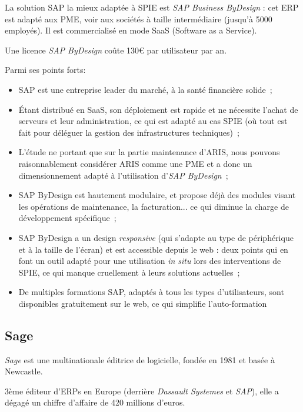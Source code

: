         La solution SAP la mieux adaptée à SPIE est \textit{SAP Business ByDesign} : cet ERP est adapté aux PME, voir aux sociétés à taille intermédiaire (jusqu'à 5000 employés). Il est commercialisé en mode SaaS (Software as a Service).

        Une licence \textit{SAP ByDesign} coûte 130€ par utilisateur par an.

        Parmi ses points forts:

        \begin{itemize}
            \item SAP est une entreprise leader du marché, à la santé financière solide~;
            \item Étant distribué en SaaS, son déploiement est rapide et ne nécessite l'achat de serveurs et leur administration, ce qui est adapté au cas SPIE (où tout est fait pour déléguer la gestion des infrastructures techniques)~;
            \item L'étude ne portant que sur la partie maintenance d'ARIS, nous pouvons raisonnablement considérer ARIS comme une PME et a donc un dimensionnement adapté à l'utilisation d'\textit{SAP ByDesign}~;
            \item SAP ByDesign est hautement modulaire, et propose déjà des modules visant les opérations de maintenance, la facturation... ce qui diminue la charge de développement spécifique~;
            \item SAP ByDesign a un design \textit{responsive} (qui s'adapte au type de périphérique et à la taille de l'écran) et est accessible depuis le web : deux points qui en font un outil adapté pour une utilisation \textit{in situ} lors des interventions de SPIE, ce qui manque cruellement à leurs solutions actuelles~;
            \item De multiples formations SAP, adaptés à tous les types d'utilisateurs, sont disponibles gratuitement sur le web, ce qui simplifie l'auto-formation
        \end{itemize}


    \subsection{Sage}

        \textit{Sage} est une multinationale éditrice de logicielle, fondée en 1981 et basée à Newcastle.

        3ème éditeur d'ERPs en Europe (derrière \textit{Dassault Systemes} et \textit{SAP}), elle a dégagé un chiffre d'affaire de 420 millions d'euros.

